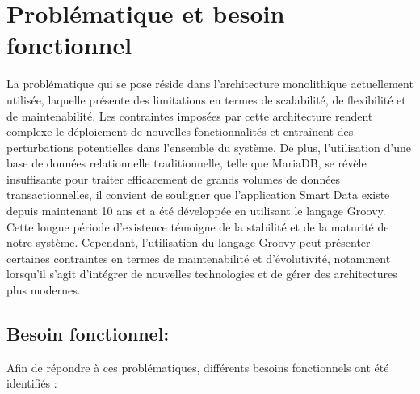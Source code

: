 \section{Problématique et besoin fonctionnel}
La problématique qui se pose réside dans l'architecture monolithique actuellement utilisée, laquelle présente des limitations en termes de scalabilité, de flexibilité et de maintenabilité. Les contraintes imposées par cette architecture rendent complexe le déploiement de nouvelles fonctionnalités et entraînent des perturbations potentielles dans l'ensemble du système. De plus, l'utilisation d'une base de données relationnelle traditionnelle, telle que MariaDB, se révèle insuffisante pour traiter efficacement de grands volumes de données transactionnelles, il convient de souligner que l'application Smart Data existe depuis maintenant 10 ans et a été développée en utilisant le langage Groovy. Cette longue période d'existence témoigne de la stabilité et de la maturité de notre système. Cependant, l'utilisation du langage Groovy peut présenter certaines contraintes en termes de maintenabilité et d'évolutivité, notamment lorsqu'il s'agit d'intégrer de nouvelles technologies et de gérer des architectures plus modernes.
 
\subsection*{Besoin fonctionnel:}

Afin de répondre à ces problématiques, différents besoins fonctionnels ont été identifiés :

